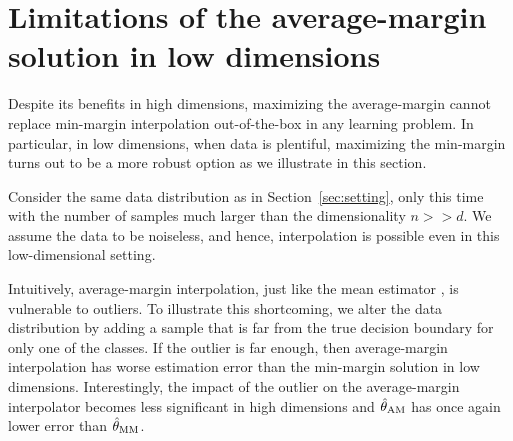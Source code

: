 \section{Limitations of the average-margin solution in low dimensions}
\label{sec:limitations}

Despite its benefits in high dimensions, maximizing the average-margin cannot
replace min-margin interpolation out-of-the-box in any learning problem. In
particular, in low dimensions, when data is plentiful, maximizing the min-margin
turns out to be a more robust option as we illustrate in this section.

Consider the same data distribution as in Section~\ref{sec:setting}, only this
time with the number of samples much larger than the dimensionality $n >> d$. We
assume the data to be noiseless, and hence, interpolation is possible even in
this low-dimensional setting.

Intuitively, average-margin interpolation, just like the mean estimator
\citep{bishop06}, is vulnerable to outliers.  To
illustrate this shortcoming, we alter the data distribution by adding a sample
that is far from the true decision boundary for only one of the classes.
If the outlier is far enough, then average-margin interpolation has worse
estimation error than the min-margin solution in low dimensions. Interestingly,
the impact of the outlier on the average-margin interpolator becomes less
significant in high dimensions and $\hat{\theta}_{\mathrm{AM}}$ has once again lower error than $\hat{\theta}_{\mathrm{MM}}$.

